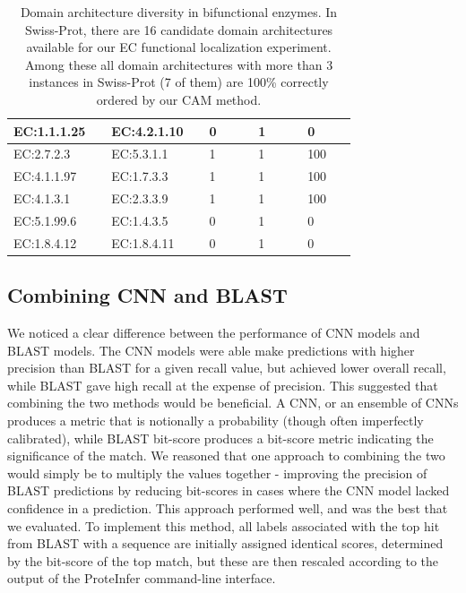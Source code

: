 \begin{table}[htbp]
\begin{tabular}{|p{0.2\linewidth}|p{0.2\linewidth}|p{0.12\linewidth}|p{0.12\linewidth}|p{0.12\linewidth}|}
  \hline
  EC:1.1.1.25  & EC:4.2.1.10   & 0                                            & 1                                        & 0                                   \\
  \hline
  EC:2.7.2.3   & EC:5.3.1.1    & 1                                            & 1                                        & 100                                 \\
  \hline
  EC:4.1.1.97  & EC:1.7.3.3    & 1                                            & 1                                        & 100                                 \\
  \hline
  EC:4.1.3.1   & EC:2.3.3.9    & 1                                            & 1                                        & 100                                 \\
  \hline
  EC:5.1.99.6  & EC:1.4.3.5    & 0                                            & 1                                        & 0                                  \\
  \hline
  EC:1.8.4.12  & EC:1.8.4.11   & 0                                            & 1                                        & 0                                   \\
  \hline
  \end{tabular}
  \caption{Domain architecture diversity in bifunctional enzymes. In Swiss-Prot, there are 16 candidate domain architectures available for our EC functional localization experiment. Among these all domain architectures with more than 3 instances in Swiss-Prot (7 of them) are 100\% correctly ordered by our CAM method.}
  \end{table}



\subsection*{Combining CNN and BLAST}
We noticed a clear difference between the performance of CNN models and BLAST models. The CNN models were able make predictions with higher precision than BLAST for a given recall value, but achieved lower overall recall, while BLAST gave high recall at the expense of precision. This suggested that combining the two methods would be beneficial. A CNN, or an ensemble of CNNs produces a metric that is notionally a probability (though often imperfectly calibrated), while BLAST bit-score produces a bit-score metric indicating the significance of the match. We reasoned that one approach to combining the two would simply be to multiply the values together - improving the precision of BLAST predictions by reducing bit-scores in cases where the CNN model lacked confidence in a prediction. This approach performed well, and was the best that we evaluated. To implement this method, all labels associated with the top hit from BLAST with a sequence are initially assigned identical scores, determined by the bit-score of the top match, but these are then rescaled according to the output of the ProteInfer command-line interface.

